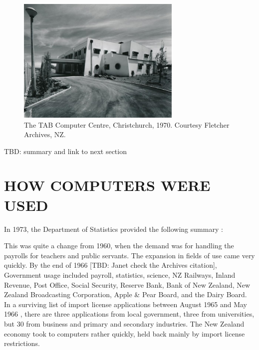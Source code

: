 \documentclass{IEEEcsmag}
\begin{document}
\begin{figure}
\centerline{\includegraphics[width=18.5pc]{TAB-Chch-1970.jpg}}
\caption{\label{TAB-ChCh}The TAB Computer Centre, Christchurch, 1970. Courtesy Fletcher Archives, NZ.}\vspace*{-5pt}
\end{figure}
TBD: summary and link to next section
\vspace*{-8pt}
\section{HOW COMPUTERS WERE USED}

In 1973, the Department of Statistics provided the following summary \cite{Yearbook73}:

\begin{quotation}
\end{quotation}

This was quite a change from 1960, when the demand was for handling the payrolls for teachers and public servants. The expansion in fields of use came very quickly. By the end of 1966 \cite{Treasury-1974} [TBD: Janet check the Archives citation], Government usage included payroll, statistics, science, NZ Railways, Inland Revenue, Post Office, Social Security, Reserve Bank, Bank of New Zealand, New Zealand Broadcasting Corporation, Apple \& Pear Board, and the Dairy Board. In a surviving list of import license applications between August 1965 and May 1966 \cite{Treasury-1974}, there are three applications from local government, three from universities, but 30 from business and primary and secondary industries. The New Zealand economy took to computers rather quickly, held back mainly by import license restrictions.
\end{document}
